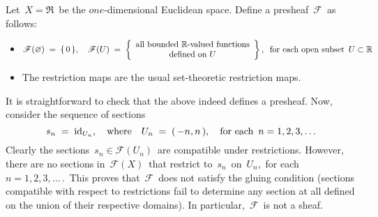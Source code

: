 
\vskip 0.5cm
\begin{example}
\mbox{}\vskip 0.1cm
\noindent
Let \,$X = \Re$\, be the $one$-dimensional Euclidean space.
Define a presheaf \,$\mathscr{F}$\, as follows:
\begin{itemize}
\item
	$
	\mathscr{F}(\varnothing) \;=\; \{\,0\,\},
	\quad
	\mathscr{F}(U) \;=\; \left\{\begin{array}{c}
		\textnormal{all bounded $\mathbb{R}$-valued functions}
		\\
		\textnormal{defined on $U$}
		\end{array}\right\},
		\;\;\textnormal{for each open subset \,$U \subset \mathbb{R}$}
	$
\item
	The restriction maps are the usual set-theoretic restriction maps.
\end{itemize}
It is straightforward to check that the above indeed defines a presheaf.
Now, consider the sequence of sections
\begin{equation*}
s_{n} \;=\; \textnormal{id}_{U_{n}},
\quad\textnormal{where}\quad 
U_{n} \;=\; (\,-n,n\,),
\quad\textnormal{for each \,$n = 1, 2, 3, \ldots$}
\end{equation*}
Clearly the sections \,$s_{n} \in \mathscr{F}(U_{n})$\, are compatible under restrictions.
However, there are no sections in \,$\mathscr{F}(X)$\, that restrict to \,$s_{n}$\, on \,$U_{n}$,\, for each \,$n = 1, 2, 3, \ldots\,$.\,
This proves that \,$\mathscr{F}$\, does not satisfy the gluing condition
(sections compatible with respect to restrictions fail to determine any section at all defined on the union of their respective domains).
In particular, \,$\mathscr{F}$\, is not a sheaf.
\end{example}

